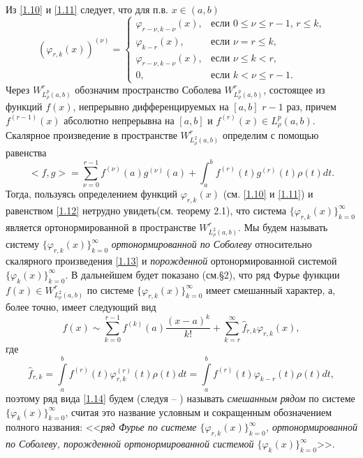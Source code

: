  Из \eqref{1.10} и \eqref{1.11} следует, что для п.в. $x\in (a,b)$
 \begin{equation}\label{1.12}
(\varphi_{r,k}(x))^{(\nu)} =\begin{cases}\varphi_{r-\nu,k-\nu}(x),&\text{если $0\le\nu\le r-1$, $r\le k$,}\\
\varphi_{k-r}(x),&\text{если  $\nu=r\le k$,}\\
\varphi_{r-\nu,k-\nu}(x),&\text{если $\nu\le k< r$,}\\
0,&\text{если $k< \nu\le r-1$}.
  \end{cases}
\end{equation}
Через $W^r_{L^p_\rho(a,b)}$ обозначим пространство Соболева $W^r_{L^p_\rho(a,b)}$, состоящее из функций $f(x)$, непрерывно дифференцируемых на $[a,b]$ $r-1$ раз, причем $f^{(r-1)}(x)$ абсолютно непрерывна на $[a,b]$  и $f^{(r)}(x)\in L^p_\rho(a,b)$.
Скалярное произведение в пространстве $W^r_{L^2_\rho(a,b)}$ определим с помощью равенства
\begin{equation}\label{1.13}
<f,g>=\sum_{\nu=0}^{r-1}f^{(\nu)}(a)g^{(\nu)}(a)+\int_{a}^{b} f^{(r)}(t)g^{(r)}(t)\rho(t) dt.
\end{equation}
Тогда, пользуясь определением функций  $\varphi_{r,k}(x)$ (см. \eqref{1.10} и \eqref{1.11}) и равенством  \eqref{1.12} нетрудно увидеть(см. теорему 2.1),  что система $\{\varphi_{r,k}(x)\}_{k=0}^\infty$ является ортонормированной в пространстве $W^r_{L^2_\rho(a,b)}$.  Мы будем называть систему $\{\varphi_{r,k}(x)\}_{k=0}^\infty$ \textit{ортонормированной по Соболеву } относительно скалярного произведения \eqref{1.13} и  \textit{порожденной} ортонормированной системой $\{\varphi_{k}(x)\}_{k=0}^\infty$.
В дальнейшем будет показано (см.\S2),  что ряд Фурье функции $f(x)\in W^r_{L^2_\rho(a,b)}$ по системе  $\{\varphi_{r,k}(x)\}_{k=0}^\infty$ имеет смешанный характер, а, более точно, имеет следующий вид
  \begin{equation}\label{1.14}
f(x)\sim \sum_{k=0}^{r-1} f^{(k)}(a)\frac{(x-a)^k}{k!}+ \sum_{k=r}^\infty \hat f_{r,k}\varphi_{r,k}(x),
\end{equation}
где
  \begin{equation}\label{1.15}
 \hat f_{r,k}=\int\limits_a^b f^{(r)}(t) \varphi^{(r)}_{r,k}(t)\rho(t)dt=\int\limits_a^b f^{(r)}(t) \varphi_{k-r}(t)\rho(t)dt,
\end{equation}
поэтому ряд  вида \eqref{1.14} будем (следуя \cite{Shar11} -- \cite{Shar16})  называть \textit{смешанным рядом} по  системе $\{\varphi_{k}(x)\}_{k=0}^\infty$, считая это название условным и сокращенным обозначением полного названия: <<\textit{ряд Фурье по системе  $\{\varphi_{r,k}(x)\}_{k=0}^\infty$, ортонормированной по Соболеву, порожденной ортонормированной системой $\{\varphi_{k}(x)\}_{k=0}^\infty$}>>.



